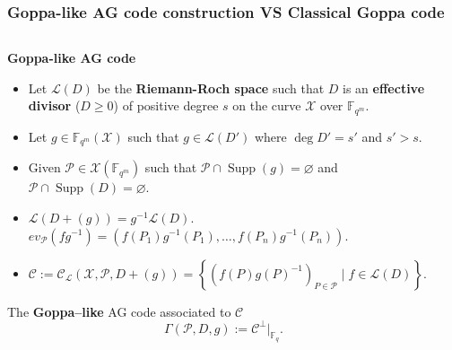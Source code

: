 \documentclass[
10pt, %
%
aspectratio=169, %
]{beamer}
\theoremstyle{plain}%
\theoremstyle{definition}
\theoremstyle{remark}
\newcommand{\calP}{\mathcal{P}}
\newcommand{\calL}{\mathcal{L}}
\newcommand{\calC}{\mathcal{C}}
\newcommand{\calX}{\mathcal{X}}
\newcommand{\fqm}{\mathbb{F}_{q^m}}
\newcommand{\fq}{\mathbb{F}_{q}}
\newcommand{\set}[1]{\left\{#1\right\}}
\newcommand{\Supp}{\operatorname{Supp}}
\begin{document}
\begin{frame}
	\frametitle{Goppa-like AG code construction VS Classical Goppa code}
\begin{columns}[c]
	\hspace{-30pt}
	\begin{column}{0.7\textwidth}
		\textbf{Goppa-like AG code}
		\begin{itemize}
		\item Let $\calL(D)$ be the \textbf{Riemann-Roch space} such that $D$ is an \textbf{effective divisor} ($D \geq 0$) of positive degree $s$ on the curve $\calX$ over $\fqm$.
		\item Let $g \in \fqm(\calX)$ such that $g \in \calL(D')$ where $\deg D' = s'$ and $s'>s$. 
		\item Given $\calP \in \calX(\fqm)$ such that $\calP \cap \Supp(g) = \varnothing$ and $\calP \cap \Supp(D) = \varnothing$.
		\item $\calL(D+(g)) = g^{-1}\calL(D)$. \textcolor{ballblue}{\textrightarrow $ev_{\calP}(fg^{-1})=\left( f(P_1)g^{-1}(P_1),\dots,f(P_n)g^{-1}(P_n) \right)$}. %
		\item $\calC := \calC_{\calL}(\calX,\calP,D+(g))=\set{\left(f(P)g(P)^{-1}\right)_{P \in \calP} \mid f \in \calL(D)}.$
	\end{itemize}
		
		\begin{block}{The \textbf{Goppa--like} AG code associated to $\calC$}
		$$ \Gamma(\calP,D,g) := \calC^{\perp}|_{\fq}.$$
		\end{block}
	\end{column}
	\hspace{-30pt}
	\vrule{}
	\begin{column}{0.3\textwidth}
		

\end{column}
\end{columns}
\end{frame}
\end{document}
